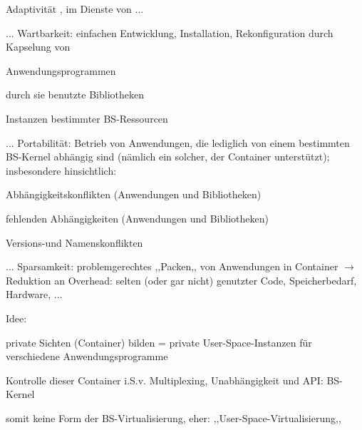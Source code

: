 \documentclass[a4paper]{article}
\begin{document}
\begin{multicols}{3}
    \begin{itemize*}
        \item
        Adaptivität , im Dienste von ...
        \item
        ... Wartbarkeit: einfachen Entwicklung, Installation, Rekonfiguration
        durch Kapselung von
        \begin{itemize*}
            \item Anwendungsprogrammen
            \item \begin{itemize*} \item durch sie benutzte Bibliotheken \end{itemize*}
            \item \begin{itemize*} \item Instanzen bestimmter BS-Ressourcen \end{itemize*}
        \end{itemize*}
        \item
        ... Portabilität: Betrieb von Anwendungen, die lediglich von einem
        bestimmten BS-Kernel abhängig sind (nämlich ein solcher, der Container
        unterstützt); insbesondere hinsichtlich:
        \begin{itemize*}
            \item Abhängigkeitskonflikten (Anwendungen und Bibliotheken)
            \item fehlenden Abhängigkeiten (Anwendungen und Bibliotheken)
            \item Versions-und Namenskonflikten
        \end{itemize*}
        \item
        ... Sparsamkeit: problemgerechtes ,,Packen,, von Anwendungen in
        Container $\rightarrow$ Reduktion an Overhead: selten
        (oder gar nicht) genutzter Code, Speicherbedarf, Hardware, ...
    \end{itemize*}

    Idee:

    \begin{itemize*}
        \item
        private Sichten (Container) bilden = private User-Space-Instanzen für
        verschiedene Anwendungsprogramme
        \item
        Kontrolle dieser Container i.S.v. Multiplexing, Unabhängigkeit und
        API: BS-Kernel
        \item
        somit keine Form der BS-Virtualisierung, eher:
        ,,User-Space-Virtualisierung,,
    \end{itemize*}


\end{multicols}
\end{document}
